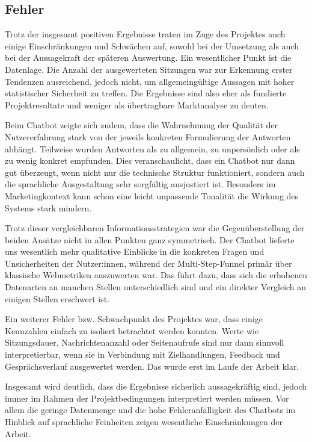 \subsection{Fehler}

Trotz der insgesamt positiven Ergebnisse traten im Zuge des
Projektes auch einige Einschränkungen und Schwächen auf, sowohl bei der
Umsetzung als auch bei der Aussagekraft der späteren Auswertung.
Ein wesentlicher Punkt ist die Datenlage. Die Anzahl der
ausgewerteten Sitzungen war zur Erkennung erster Tendenzen ausreichend,
jedoch nicht, um allgemeingültige Aussagen mit hoher statistischer
Sicherheit zu treffen. Die Ergebnisse sind also eher als fundierte
Projektresultate und weniger als übertragbare Marktanalyse zu
deuten.

Beim Chatbot zeigte sich zudem, dass die Wahrnehmung der Qualität der
Nutzererfahrung stark von der jeweils konkreten Formulierung der
Antworten abhängt. Teilweise wurden Antworten als zu
allgemein, zu unpersönlich oder als zu wenig konkret empfunden. Dies
veranschaulicht, dass ein Chatbot nur dann gut überzeugt, wenn nicht
nur die technische Struktur funktioniert, sondern auch die sprachliche
Ausgestaltung sehr sorgfältig ausjustiert ist. Besonders im Marketingkontext
kann schon eine leicht unpassende Tonalität die Wirkung des
Systems stark mindern.

Trotz dieser vergleichbaren Informationsstrategien war die Gegenüberstellung der beiden Ansätze nicht in allen Punkten ganz symmetrisch.
Der Chatbot lieferte uns wesentlich mehr qualitative Einblicke in die
konkreten Fragen und Unsicherheiten der Nutzer:innen, während der
Multi-Step-Funnel primär über klassische Webmetriken auszuwerten
war. Das führt dazu, dass sich die erhobenen Datenarten an manchen Stellen unterschiedlich sind
 und ein direkter Vergleich an einigen Stellen erschwert ist.

Ein weiterer Fehler bzw. Schwachpunkt des Projektes war, dass einige
Kennzahlen einfach zu isoliert betrachtet werden konnten. Werte wie
Sitzungsdauer, Nachrichtenanzahl oder Seitenaufrufe sind nur dann
sinnvoll interpretierbar, wenn sie in Verbindung mit Zielhandlungen,
Feedback und Gesprächsverlauf ausgewertet werden. Das wurde erst im
Laufe der Arbeit klar.

Insgesamt wird deutlich, dass die Ergebnisse sicherlich aussagekräftig sind,
jedoch immer im Rahmen der Projektbedingungen interpretiert werden
müssen. Vor allem die geringe Datenmenge und die hohe
Fehleranfälligkeit des Chatbots im Hinblick auf sprachliche Feinheiten
zeigen wesentliche Einschränkungen der Arbeit.

